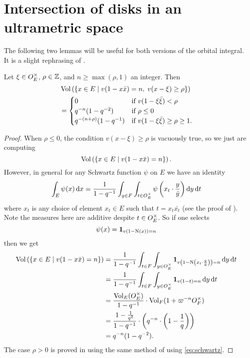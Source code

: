 \section{Intersection of disks in an ultrametric space}
The following two lemmas will be useful for both versions of the orbital integral.
It is a slight rephrasing of \cite[Lemma 4.4]{ref:AFL}.

\begin{lemma}
  \label{lem:volume}
  Let $\xi \in O_E^\times$, $\rho \in \mathbb Z$, and $n \ge \max(\rho, 1)$ an integer.
  Then
  \begin{align*}
    &\operatorname{Vol}\left( \left\{ x \in E \mid v(1-x \bar x) = n,
      \; v(x-\xi) \ge \rho \right\} \right) \\
    &=
    \begin{cases}
      0 & \text{if } v(1-\xi\bar\xi) < \rho \\
      q^{-n}(1-q^{-2}) & \text{if } \rho \le 0 \\
      q^{-(n+\rho)}(1-q^{-1}) & \text{if } v(1-\xi\bar\xi) \ge \rho \ge 1.
    \end{cases}
  \end{align*}
\end{lemma}
\begin{proof}
  When $\rho \le 0$, the condition $v(x - \xi) \ge \rho$ is vacuously true,
  so we just are computing
  \[ \operatorname{Vol}\left( \left\{ x \in E \mid v(1-x \bar x) = n \right\} \right). \]
  However, in general for any Schwartz function $\psi$ on $E$ we have an identity
  \begin{equation}
    \int_E \psi(x) \odif x
    = \frac{1}{1-q\inv} \int_{y \in F} \int_{t \in \OO_E^\times}
    \psi\left( x_t \cdot \frac{y}{\bar y} \right) \odif y \odif t
    \label{eq:schwartz}
  \end{equation}
  where $x_t$ is any choice of element $x_t \in E$ such that $t = x_t \bar{x_t}$
  (see the proof of \cite[Lemma 4.4]{ref:AFL}).
  Note the measures here are additive despite $t \in O_E^\times$.
  So if one selects
  \[ \psi(x) = \mathbf{1}_{v(1 - \operatorname{N}(x)) = n} \]
  then we get
  \begin{align*}
    \Vol\left( \left\{ x \in E \mid v(1-x \bar x) = n \right\} \right)
    &= \frac{1}{1-q\inv} \int_{t \in F} \int_{y \in \OO_E^\times}
    \mathbf{1}_{v\left( 1 - \Norm\left(x_t \cdot \frac{y}{\bar y} \right) \right) = n} \odif y \odif t \\
    &= \frac{1}{1-q\inv} \int_{t \in F} \int_{y \in \OO_E^\times}
    \mathbf{1}_{v\left( 1 - t \right) = n} \odif y \odif t \\
    &= \frac{\Vol_E(\OO_E^\times)}{1-q\inv} \cdot \Vol_F(1 + \varpi^{-n} \OO_F^\times) \\
    &= \frac{1 - \frac{1}{q^2}}{1-q\inv}
      \cdot \left( q^{-n} \cdot \left( 1 - \frac 1q \right) \right) \\
    &= q^{-n} (1-q^{-2}).
  \end{align*}
  The case $\rho > 0$ is proved in \cite[Lemma 4.4]{ref:AFL}
  using the same method of using \eqref{eq:schwartz}.
\end{proof}


